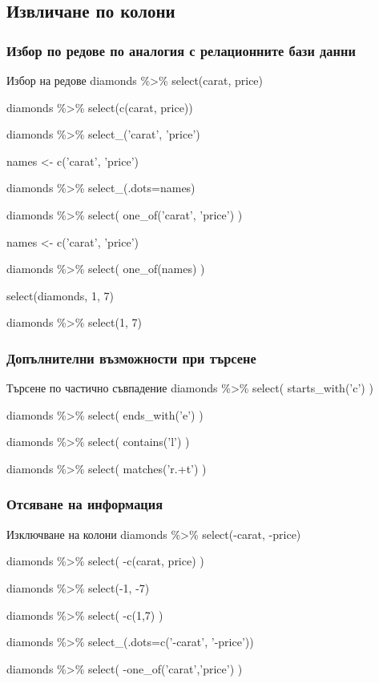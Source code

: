 \documentclass{beamer}
\begin{document}
\subsection{Извличане по колони}

\begin{frame}
\frametitle{Избор по редове по аналогия с релационните бази данни}
\begin{block}{Избор на редове}
diamonds \%>\% select(carat, price)

diamonds \%>\% select(c(carat, price))

diamonds \%>\% select\_('carat', 'price')

names <- c('carat', 'price')

diamonds \%>\% select\_(.dots=names)

diamonds \%>\% select( one\_of('carat', 'price') )

names <- c('carat', 'price')

diamonds \%>\% select( one\_of(names) )

select(diamonds, 1, 7)

diamonds \%>\% select(1, 7)
\end{block}
\end{frame}

\begin{frame}
\frametitle{Допълнителни възможности при търсене}
\begin{block}{Търсене по частично съвпадение}
diamonds \%>\% select( starts\_with('c') )

diamonds \%>\% select( ends\_with('e') )

diamonds \%>\% select( contains('l') )

diamonds \%>\% select( matches('r.+t') )
\end{block}
\end{frame}

\begin{frame}
\frametitle{Отсяване на информация}
\begin{block}{Изключване на колони}
diamonds \%>\% select(-carat, -price)

diamonds \%>\% select( -c(carat, price) )

diamonds \%>\% select(-1, -7)

diamonds \%>\% select( -c(1,7) )

diamonds \%>\% select\_(.dots=c('-carat', '-price'))

diamonds \%>\% select( -one\_of('carat','price') )
\end{block}
\end{frame}
\end{document}
